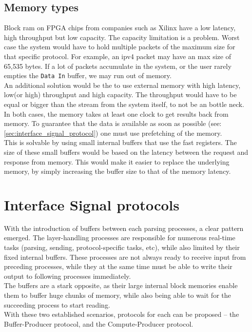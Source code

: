 \subsection{Memory types}  \label{subsec:memory_types}
Block ram on FPGA chips from companies such as Xilinx have a low latency, high
throughput but low capacity.\cite{xilinx_fpga_memory_resources}
The capacity limitation is a problem. Worst case the
system would have to hold multiple packets of the maximum size for that specific
protocol. For example, an \gls{ipv4} packet may have an max size of 65,535
bytes.\cite{RFC0791} If a lot of packets accumulate in the system, or the user
rarely empties the \texttt{Data In} buffer, we may run out of memory.\\
An additional solution would be the to use external memory with high latency,
low(or high) throughput and high capacity. The throughput would have to be equal
or bigger than the stream from the system itself, to not be an bottle
neck.\\
In both cases, the memory takes at least one clock to get results back from
memory. To guarantee that the data is available as soon as possible
(see: \autoref{sec:interface_signal_protocol}) one must use prefetching of the
memory.\\
This is solvable by using small internal buffers that use the fast registers.
The size of these small buffers would be based on the latency between the
request and response from memory. This would make it easier to
replace the underlying memory, by simply increasing the buffer size to that
of the memory latency.


\section{Interface Signal protocols}
\label{sec:interface_signal_protocol}
With the introduction of buffers between each parsing processes, a clear pattern
emerged. The layer-handling processes are responsible for numerous real-time tasks
(parsing, sending, protocol-specific tasks, etc), while also limited by their
fixed internal buffers. These processes are not always ready to receive input
from preceding processes, while they at the same time must be able to write their
output to following processes immediately.\\
The buffers are a stark opposite, as their large internal block memories enable
them to buffer huge chunks of memory, while also being able to wait for the
succeeding process to start reading.\\
With these two established scenarios, protocols for each can be proposed -- the
Buffer-Producer protocol, and the Compute-Producer protocol.

